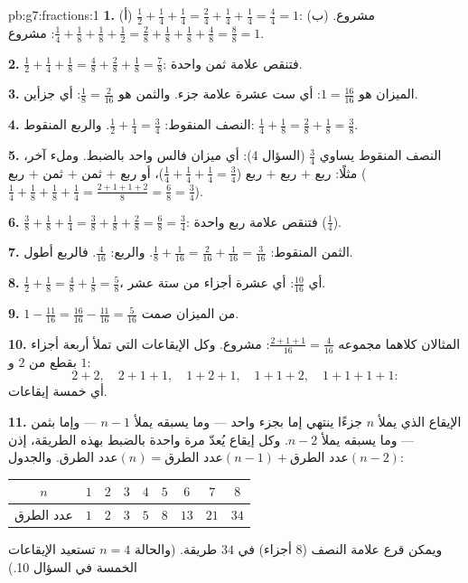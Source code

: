 \begin{solution}{pb:g7:fractions:1}
\textbf{1.} (أ) $\frac12 + \frac14 + \frac14 = \frac24 + \frac14
+ \frac14 = \frac44 = 1$: مشروع. (ب) $\frac14 + \frac18 +
\frac18 + \frac12 = \frac28 + \frac18 + \frac18 + \frac48 =
\frac88 = 1$: مشروع.

\textbf{2.} $\frac12 + \frac14 + \frac18 = \frac48 + \frac28 +
\frac18 = \frac78$: فتنقص علامة ثمن واحدة.

\textbf{3.} الميزان هو $1 = \frac{16}{16}$: أي ست عشرة علامة
جزء. والثمن هو $\frac18 = \frac{2}{16}$: أي جزأين.

\textbf{4.} النصف المنقوط: $\frac12 + \frac14 = \frac34$. والربع
المنقوط: $\frac14 + \frac18 = \frac28 + \frac18 = \frac38$.

\textbf{5.} النصف المنقوط يساوي $\frac34$ (السؤال 4):
أي ميزان فالس واحد بالضبط. وملء آخر، مثلًا: ربع
$+$ ربع $+$ ربع ($\frac14 + \frac14 + \frac14 =
\frac34$)، أو ربع $+$ ثمن $+$ ثمن $+$ ربع
($\frac14 + \frac18 + \frac18 + \frac14 = \frac{2 + 1 + 1 +
2}{8} = \frac68 = \frac34$).

\textbf{6.} $\frac38 + \frac18 + \frac14 = \frac38 + \frac18 +
\frac28 = \frac68 = \frac34$: فتنقص علامة ربع واحدة
($\frac14$).

\textbf{7.} الثمن المنقوط: $\frac18 + \frac{1}{16} =
\frac{2}{16} + \frac{1}{16} = \frac{3}{16}$. والربع:
$\frac{4}{16}$. فالربع أطول.

\textbf{8.} $\frac12 + \frac18 = \frac48 + \frac18 = \frac58$،
أي $\frac{10}{16}$: أي عشرة أجزاء من ستة عشر.

\textbf{9.} $1 - \frac{11}{16} = \frac{16}{16} - \frac{11}{16}
= \frac{5}{16}$ من الميزان صمت.

\textbf{10.} المثالان كلاهما مجموعه $\frac{2 + 1 + 1}{16} =
\frac{4}{16}$: مشروع. وكل الإيقاعات التي تملأ أربعة أجزاء
بقطع من $2$ و $1$:
\[
2{+}2, \quad 2{+}1{+}1, \quad 1{+}2{+}1, \quad 1{+}1{+}2, \quad
1{+}1{+}1{+}1 :
\]
أي خمسة إيقاعات.

\textbf{11.} الإيقاع الذي يملأ $n$ جزءًا ينتهي إما بجزء
واحد --- وما يسبقه يملأ $n - 1$ --- وإما
بثمن --- وما يسبقه يملأ $n - 2$. وكل إيقاع
يُعدّ مرة واحدة بالضبط بهذه الطريقة، إذن
$\text{عدد الطرق}(n) = \text{عدد الطرق}(n-1) + \text{عدد الطرق}(n-2)$. والجدول:
\begin{center}
\renewcommand{\arraystretch}{1.2}
\begin{tabular}{c|cccccccc}
$n$ & $1$ & $2$ & $3$ & $4$ & $5$ & $6$ & $7$ & $8$ \\
\hline
عدد الطرق & $1$ & $2$ & $3$ & $5$ & $8$ & $13$ & $21$ & $34$ \\
\end{tabular}
\end{center}
ويمكن قرع علامة النصف ($8$ أجزاء) في $34$ طريقة.
(والحالة $n = 4$ تستعيد الإيقاعات الخمسة في السؤال 10.)


\end{solution}
